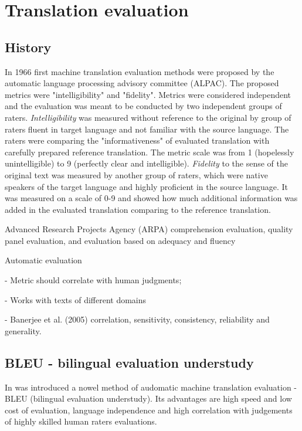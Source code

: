 \section{Translation evaluation}

\subsection*{History}

In 1966 first machine translation evaluation methods were proposed
by the automatic language processing advisory committee (ALPAC).
The proposed metrics were "intelligibility" and "fidelity"\citep[p~67]{Translation1966}.
Metrics were considered independent and the evaluation was meant to be conducted
by two independent groups of raters.
\textit{Intelligibility} was measured without reference to the original by
group of raters fluent in target language and not familiar with the source language.
The raters were comparing the "informativeness" of evaluated translation with carefully
prepared reference translation. The metric scale was from 1 (hopelessly unintelligible)
to 9 (perfectly clear and intelligible).
\textit{Fidelity} to the sense of the original text was measured by another group of raters,
which were native speakers of the target language and highly proficient in the source language.
It was measured on a scale of 0-9 and showed how much additional information was added in
the evaluated translation comparing to the reference translation.

Advanced Research Projects Agency (ARPA)
comprehension evaluation, quality panel evaluation, and evaluation based on adequacy and fluency

Automatic evaluation

- Metric should correlate with human judgments;

- Works with texts of different domains

- Banerjee et al. (2005) correlation, sensitivity, consistency, reliability and generality.

\subsection*{BLEU - bilingual evaluation understudy}

In \cite{Papineni02bleu} was introduced a nowel method of audomatic machine translation evaluation -
BLEU (bilingual evaluation understudy). Its advantages are high speed and low cost of evaluation,
language independence and high correlation with judgements of highly skilled human raters evaluations.

